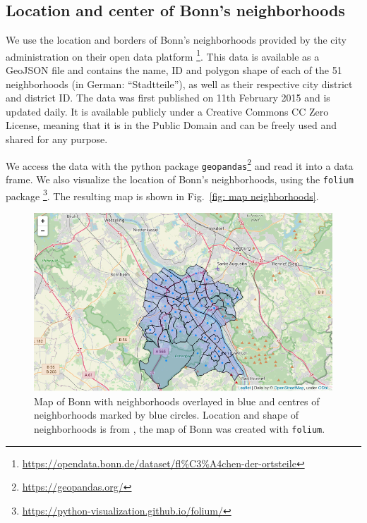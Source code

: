 \documentclass[UKenglish]{scrreprt}
\begin{document}
\subsection{Location and center of Bonn's neighborhoods}
We use the location and borders of Bonn's neighborhoods provided by the city administration on their open data platform \footnote{\href{https://opendata.bonn.de/dataset/fl\%C3\%A4chen-der-ortsteile}{https://opendata.bonn.de/dataset/fl\%C3\%A4chen-der-ortsteile}}\cite{Ortsteile}. This data is available as a GeoJSON file and contains the name, ID and polygon shape of each of the 51 neighborhoods (in German: \enquote{Stadtteile}), as well as their respective city district and district ID.
The data was first published on 11th February 2015 and is updated daily. It is available publicly under a Creative Commons CC Zero License, meaning that 
it is in the Public Domain and can be freely used and shared for any purpose.

We access the data with the python package \verb|geopandas|\footnote{\href{https://geopandas.org/}{https://geopandas.org/}} and read it into a data frame. We also visualize the location of Bonn's neighborhoods, using the \verb|folium| package \footnote{\href{https://python-visualization.github.io/folium/}{https://python-visualization.github.io/folium/}}. The resulting map is shown in Fig.~\ref{fig: map neighborhoods}.

\begin{figure}[htbp]
	\centering
	\includegraphics[width=\textwidth]{Figs/Map_Neighborhoods.png}
	\caption{Map of Bonn with neighborhoods overlayed in blue and centres of neighborhoods marked by blue circles. Location and shape of neighborhoods is from \cite{Ortsteile}, the map of Bonn was created with \texttt{folium}.}
	\label{fig:map neighborhoods}
\end{figure}
\end{document}
